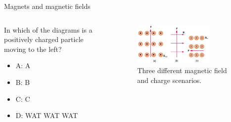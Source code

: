 \documentclass{beamer}
\begin{document}
\begin{frame}{Magnets and magnetic fields}
\begin{columns}[T]
\begin{column}{0.3\textwidth}
In which of the diagrams is a positively charged particle moving to the left?
\begin{itemize}
\item A: A
\item B: B
\item C: C
\item D: WAT WAT WAT
\end{itemize}
\end{column}
\begin{column}{0.7\textwidth}
\begin{figure}
\centering
\includegraphics[width=0.75\textwidth]{figures/lorentzProblem.png}
\caption{\label{fig:lorentzProblem2} Three different magnetic field and charge scenarios.}
\end{figure}
\end{column}
\end{columns}
\end{frame}
\end{document}
